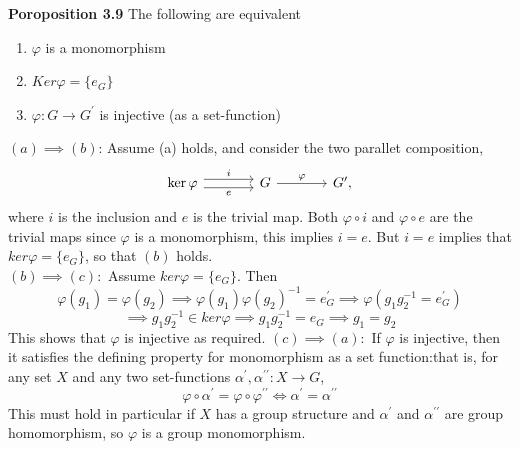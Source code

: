 \textbf{Poroposition 3.9}
The following are equivalent
\begin{enumerate}
    \item $\varphi$ is a monomorphism
    \item $Ker\varphi = \{e_G\}$
    \item $\varphi : G \to G^\prime$ is injective (as a set-function)
\end{enumerate}

 $(a) \implies (b)$: Assume (a) holds, and consider the two parallet composition,
\[
\begin{tikzcd}[column sep=large]
\ker \varphi \arrow[r, shift left=0.7ex, "i"] \arrow[r, shift right=0.7ex, "e"'] & G \arrow[r, "\varphi"] & G',
\end{tikzcd}
\]
where $i$ is the inclusion and $e$ is the trivial map.
Both $\varphi \circ i$ and $\varphi \circ e$ are the
trivial maps since $\varphi$ is a monomorphism, this
implies $i = e$. But $i=e$ implies that $ker\varphi = \{e_G\}$,
so that $(b)$ holds.\\
$(b) \implies (c):$ Assume $ker\varphi = \{e_G\}$. Then
$$\varphi(g_1) = \varphi(g_2) \implies \varphi(g_1)\varphi(g_2)^{-1} = e_G^\prime \implies \varphi(g_1g_2^{-1} = e_G^\prime)$$
$$\implies g_1g_2^{-1} \in ker\varphi \implies g_1g_2^{-1} = e_G \implies g_1 = g_2$$
This shows that $\varphi$ is injective as required.
$(c) \implies (a):$ If $\varphi$ is injective, then it satisfies the defining
property for monomorphism as a set function:that is, for any set $X$ and any two set-functions $\alpha^\prime, \alpha^{\prime \prime}: X \to G$,
$$\varphi \circ \alpha^\prime = \varphi \circ \varphi^{\prime \prime} \iff \alpha^\prime = \alpha^{\prime \prime}$$
This must hold in particular if $X$ has a group structure and $\alpha^\prime$ and $\alpha^{\prime \prime}$ are group homomorphism, so $\varphi$ is a group monomorphism.

